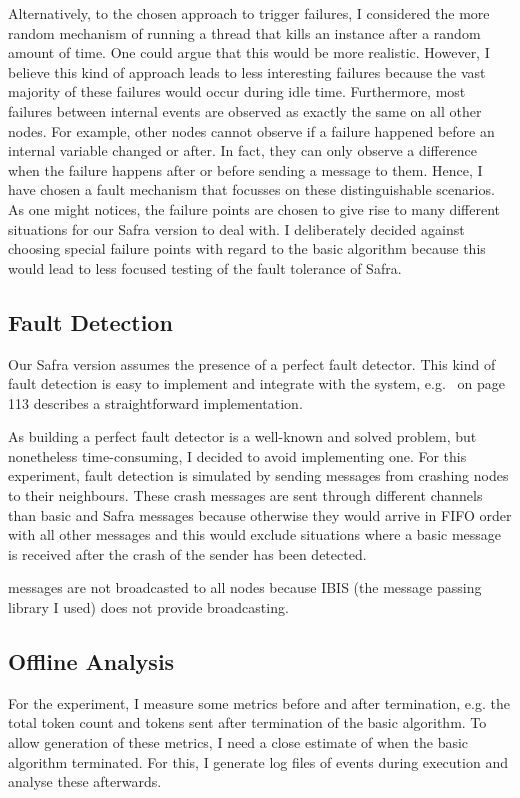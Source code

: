 Alternatively, to the chosen approach to trigger failures, I considered the more random mechanism of running a thread that kills an instance after a random amount of time.
One could argue that this would be more realistic.
However, I believe this kind of approach leads to less interesting failures because the vast majority of these failures would occur during idle time.
Furthermore, most failures between internal events are observed as exactly the same on all other nodes.
For example, other nodes cannot observe if a failure happened before an internal variable changed or after.
In fact, they can only observe a difference when the failure happens after or before sending a message to them.
Hence, I have chosen a fault mechanism that focusses on these distinguishable scenarios.
As one might notices, the failure points are chosen to give rise to many different situations for our Safra version to deal with.
I deliberately decided against choosing special failure points with regard to the basic algorithm because this would lead to less focused testing of the fault tolerance of Safra.

\subsection{Fault Detection}
Our Safra version assumes the presence of a perfect fault detector.
This kind of fault detection is easy to implement and integrate with the system, e.g.~\cite{fokkink:2018} on page 113 describes a straightforward implementation.

As building a perfect fault detector is a well-known and solved problem, but nonetheless time-consuming, I decided to avoid implementing one.
For this experiment, fault detection is simulated by sending  messages from crashing nodes to their neighbours.
These crash messages are sent through different channels than basic and Safra messages because otherwise they would arrive in FIFO order with all other messages and this would exclude situations where a basic message is received after the crash of the sender has been detected.

 messages are not broadcasted to all nodes because IBIS (the message passing library I used) does not provide broadcasting.

\subsection{Offline Analysis}
\label{ssec:offline-analysis}
For the experiment, I measure some metrics before and after termination, e.g. the total token count and tokens sent after termination of the basic algorithm.
To allow generation of these metrics, I need a close estimate of when the basic algorithm terminated.
For this, I generate log files of events during execution and analyse these afterwards.

